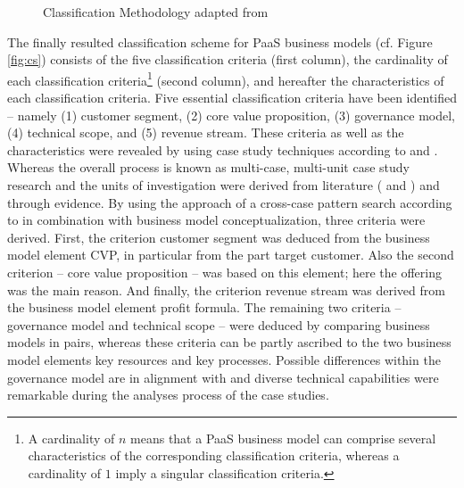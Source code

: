 \begin{figure}[t]
	\centering
	
	\caption[Classification Methodology]{Classification Methodology adapted from \citet[p. 44]{Fettke2003}}
	\label{fig:cm}
\end{figure}

The finally resulted classification scheme for \ac{PaaS} business models (cf. Figure \ref{fig:cs}) consists of the five classification criteria (first column), the cardinality of each classification criteria\footnote{A cardinality of $n$ means that a \ac{PaaS} business model can comprise several characteristics of the corresponding classification criteria, whereas a cardinality of $1$ imply a singular classification criteria.} (second column), and hereafter the characteristics of each classification criteria. Five essential classification criteria have been identified -- namely (1) customer segment, (2) core value proposition, (3) governance model, (4) technical scope, and (5) revenue stream. These criteria as well as the characteristics were revealed by using case study techniques according to \citet{Eisenhardt1989} and \citet{Yin2008}. Whereas the overall process is known as multi-case, multi-unit case study research \citep{Yin2008} and the units of investigation were derived from literature (\citealp{Johnson2008} and \citealp{Tiwana2010}) and through evidence. By using the approach of a cross-case pattern search according to \citet{Eisenhardt1989} in combination with \citet{Johnson2008} business model conceptualization, three criteria were derived. First, the criterion customer segment was deduced from the business model element \ac{CVP}, in particular from the part target customer. Also the second criterion -- core value proposition -- was based on this element; here the offering was the main reason. And finally, the criterion revenue stream was derived from the business model element profit formula. The remaining two criteria -- governance model and technical scope -- were deduced by comparing business models in pairs, whereas these criteria can be partly ascribed to the two business model elements key resources and key processes. Possible differences within the governance model are in alignment with \citet{Tiwana2010} and diverse technical capabilities were remarkable during the analyses process of the case studies.

